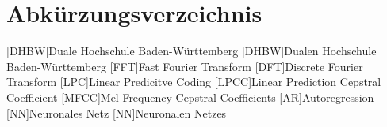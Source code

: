 \section*{Abkürzungsverzeichnis}
\begin{acronym}
  [DHBW]{Duale Hochschule Ba\-den-\-Würt\-tem\-berg}
  [DHBW]{Dualen Hochschule Ba\-den-\-Würt\-tem\-berg}
  [FFT]{Fast Fourier Transform}
  [DFT]{Discrete Fourier Transform}
  [LPC]{Linear Predicitve Coding}
  [LPCC]{Linear Prediction Cepstral Coefficient}
  [MFCC]{Mel Frequency Cepstral Coefficients}
  [AR]{Autoregression}
  [NN]{Neuronales Netz}
  [NN]{Neuronalen Netzes}
\end{acronym}
\newpage
